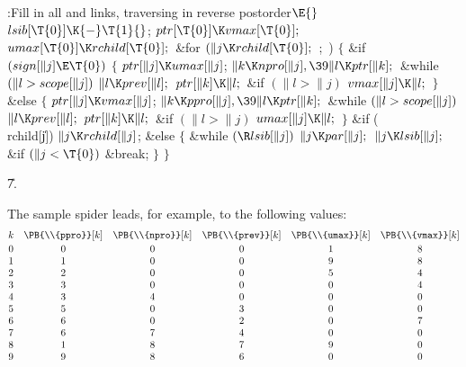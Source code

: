 \Y\B\4:Fill in all  and  links, traversing in
reverse postorder\X${}\E{}$\6
$\\{lsib}[\T{0}]\K{-}\T{1}{}$;\6
${}\\{ptr}[\T{0}]\K\\{vmax}[\T{0}];{}$\6
${}\\{umax}[\T{0}]\K\\{rchild}[\T{0}];{}$\6
\&{for} ${}(\|j\K\\{rchild}[\T{0}];{}$  ; \,)\5
${}\{{}$\1\6
\&{if} ${}(\\{sign}[\|j]\E\T{0}){}$\5
${}\{{}$\1\6
${}\\{ptr}[\|j]\K\\{umax}[\|j]{}$;\6
${}\|k\K\\{npro}[\|j],\39\|l\K\\{ptr}[\|k];{}$\6
\&{while} ${}(\|l>\\{scope}[\|j]){}$\1\5
${}\|l\K\\{prev}[\|l];{}$\2\6
${}\\{ptr}[\|k]\K\|l;{}$\6
\&{if} ${}(\|l>\|j){}$\1\5
${}\\{vmax}[\|j]\K\|l;{}$\2\6
\4${}\}{}$\5
\2\&{else}\5
${}\{{}$\1\6
${}\\{ptr}[\|j]\K\\{vmax}[\|j]{}$;\6
${}\|k\K\\{ppro}[\|j],\39\|l\K\\{ptr}[\|k];{}$\6
\&{while} ${}(\|l>\\{scope}[\|j]){}$\1\5
${}\|l\K\\{prev}[\|l];{}$\2\6
${}\\{ptr}[\|k]\K\|l;{}$\6
\&{if} ${}(\|l>\|j){}$\1\5
${}\\{umax}[\|j]\K\|l;{}$\2\6
\4${}\}{}$\2\6
\&{if} (\\{rchild}[\|j])\1\5
${}\|j\K\\{rchild}[\|j]{}$;\2\6
\&{else}\5
${}\{{}$\1\6
\&{while} ${}(\R\\{lsib}[\|j]){}$\1\5
${}\|j\K\\{par}[\|j];{}$\2\6
${}\|j\K\\{lsib}[\|j];{}$\6
\&{if} ${}(\|j<\T{0}){}$\1\5
\&{break};\2\6
\4${}\}{}$\2\6
\4${}\}{}$\2\par
\U7.\fi

The sample spider leads, for example, to the following values:
$$\vbox{\halign{$\hfil#\hfil$\quad&
$\hfil#\hfil$\quad&
$\hfil#\hfil$\quad&
$\hfil#\hfil$\quad&
$\hfil#\hfil$\quad&
$\hfil#\hfil$\cr
k&\PB{\\{ppro}}[k]&\PB{\\{npro}}[k]&\PB{\\{prev}}[k]&\PB{\\{umax}}[k]&\PB{%
\\{vmax}}[k]\cr
\noalign{\vskip2pt}
0&0&0&0&1&8\cr
1&1&0&0&9&8\cr
2&2&0&0&5&4\cr
3&3&0&0&0&4\cr
4&3&4&0&0&0\cr
5&5&0&3&0&0\cr
6&6&0&2&0&7\cr
7&6&7&4&0&0\cr
8&1&8&7&9&0\cr
9&9&8&6&0&0\cr}}$$


